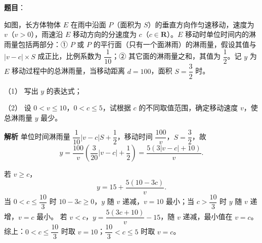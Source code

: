 \begin{answer}

\textbf{题目}：

如图，长方体物体 $E$ 在雨中沿面 $P$（面积为 $S$）的垂直方向作匀速移动，速度为 $v$（$v>0$），雨速沿 $E$ 移动方向的分速度为 $c$（$c\in\mathbf R$）。$E$ 移动时单位时间内的淋雨量包括两部分：① $P$ 或 $P$ 的平行面（只有一个面淋雨）的淋雨量，假设其值与 $|v-c|\times S$ 成正比，比例系数为 $\dfrac1{10}$；② 其它面的淋雨量之和，其值为 $\dfrac12$。记 $y$ 为 $E$ 移动过程中的总淋雨量，当移动距离 $d=100$，面积 $S=\dfrac32$ 时。

（1） 写出 $y$ 的表达式；

（2） 设 $0<v\leqslant10$，$0<c\leqslant5$，试根据 $c$ 的不同取值范围，确定移动速度 $v$，使总淋雨量 $y$ 最少。
\nopagebreak[4]
\begin{center}\end{center}
\nopagebreak[4]
\textbf{解析}
单位时间淋雨量 $\dfrac1{10}|v-c|S+\dfrac12$，移动时间 $\dfrac{100}v$，$S=\dfrac32$，故
\nopagebreak[4]
\[y=\frac{100}v\left(\frac3{20}|v-c|+\frac12\right)=\frac{5(3|v-c|+10)}v.\]

若 $v\geqslant c$，
\nopagebreak[4]
\[y=15+\frac{5(10-3c)}v.\]
当 $0<c\leqslant\dfrac{10}3$ 时 $10-3c\geqslant0$，$y$ 随 $v$ 递减，$v=10$ 最小；当 $c>\dfrac{10}3$ 时 $y$ 随 $v$ 递增，$v=c$ 最小。
若 $v<c$，$y=\dfrac{5(3c+10)}v-15$，随 $v$ 递减，最小值在 $v=c$。
综上：$0<c\leqslant\dfrac{10}3$ 时取 $v=10$；$\dfrac{10}3<c\leqslant5$ 时取 $v=c$。



\end{answer}
